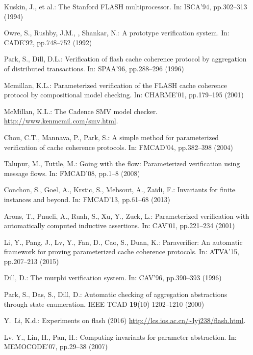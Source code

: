 \documentclass{llncs}
\begin{document}
\vspace{-3pt}
%
%

\begin{thebibliography}{50}

Kuskin, J., et al.:
\newblock The Stanford FLASH multiprocessor.
\newblock In: ISCA'94, pp.302--313 (1994)

Owre, S., Rushby, J.M., , Shankar, N.:
 {A} prototype verification system.
\newblock In: CADE'92,  pp.748--752 (1992)

Park, S., Dill, D.L.:
\newblock Verification of flash cache coherence protocol by aggregation of
  distributed transactions.
\newblock In: SPAA'96, pp.288--296 (1996)

Mcmillan, K.L.:
\newblock Parameterized verification of the FLASH cache coherence protocol by
  compositional model checking.
\newblock In: CHARME'01, pp.179--195 (2001)

McMillan, K.L.:
\newblock The Cadence SMV model checker. \url{http://www.kenmcmil.com/smv.html}.

Chou, C.T., Mannava, P., Park, S.:
\newblock A simple method for parameterized verification of cache coherence
  protocols.
\newblock In: FMCAD'04, pp.382--398 (2004)

Talupur, M., Tuttle, M.:
\newblock Going with the flow: Parameterized verification using message flows.
\newblock In: FMCAD'08, pp.1--8 (2008)

Conchon, S., Goel, A., Krstic, S., Mebsout, A., Zaidi, F.:
\newblock Invariants for finite instances and beyond.
\newblock In: FMCAD'13, pp.61--68 (2013)

Arons, T., Pnueli, A., Ruah, S., Xu, Y., Zuck, L.:
\newblock Parameterized verification with automatically computed inductive
  assertions.
\newblock In: CAV'01, pp.221--234 (2001)

Li, Y., Pang, J., Lv, Y., Fan, D., Cao, S., Duan, K.:
\newblock Paraverifier: An automatic framework for proving parameterized cache
  coherence protocols.
\newblock In: ATVA'15, pp.207--213 (2015)

Dill, D.:
\newblock The murphi verification system.
\newblock In: CAV'96, pp.390--393 (1996)

Park, S., Das, S., Dill, D.:
\newblock Automatic checking of aggregation abstractions through state
  enumeration.
\newblock IEEE TCAD \textbf{19}(10) 1202--1210 (2000)

Y.~Li, K.d.:
\newblock Experiments on flash (2016)
  \url{http://lcs.ios.ac.cn/~lyj238/flash.html}.

Lv, Y., Lin, H., Pan, H.:
\newblock Computing invariants for parameter abstraction.
\newblock In: MEMOCODE'07, pp.29--38 (2007)

\end{thebibliography}
\end{document}
